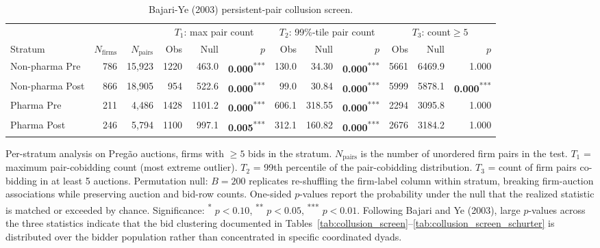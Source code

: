 \begin{table}[!htbp]
\centering
\begin{threeparttable}
\caption{Bajari-Ye (2003) persistent-pair collusion screen.}
\label{tab:collusion_screen_bajariye}
\footnotesize
\setlength{\tabcolsep}{4pt}
\providecommand{\sym}[1]{\textsuperscript{#1}}
\begin{tabular}{lrrrrrrrrrrr}
\toprule
 & & & \multicolumn{3}{c}{$T_1$: max pair count} & \multicolumn{3}{c}{$T_2$: 99\%-tile pair count} & \multicolumn{3}{c}{$T_3$: count$\geq 5$} \\
\cmidrule(lr){4-6}\cmidrule(lr){7-9}\cmidrule(lr){10-12}
Stratum & $N_{\mathrm{firms}}$ & $N_{\mathrm{pairs}}$ & Obs & Null & $p$ & Obs & Null & $p$ & Obs & Null & $p$ \\
\midrule
Non-pharma Pre & 786 & 15,923 & 1220 & 463.0 & \textbf{0.000}\sym{***} & 130.0 & 34.30 & \textbf{0.000}\sym{***} & 5661 & 6469.9 & 1.000 \\
Non-pharma Post & 866 & 18,905 & 954 & 522.6 & \textbf{0.000}\sym{***} & 99.0 & 30.84 & \textbf{0.000}\sym{***} & 5999 & 5878.1 & \textbf{0.000}\sym{***} \\
Pharma Pre & 211 & 4,486 & 1428 & 1101.2 & \textbf{0.000}\sym{***} & 606.1 & 318.55 & \textbf{0.000}\sym{***} & 2294 & 3095.8 & 1.000 \\
Pharma Post & 246 & 5,794 & 1100 & 997.1 & \textbf{0.005}\sym{***} & 312.1 & 160.82 & \textbf{0.000}\sym{***} & 2676 & 3184.2 & 1.000 \\
\bottomrule
\end{tabular}
\begin{tablenotes}[flushleft]\footnotesize
\item Per-stratum analysis on Preg\~ao auctions, firms with $\geq 5$ bids in the stratum. $N_{\mathrm{pairs}}$ is the number of unordered firm pairs in the test. $T_1$ = maximum pair-cobidding count (most extreme outlier). $T_2$ = 99th percentile of the pair-cobidding distribution. $T_3$ = count of firm pairs co-bidding in at least 5 auctions. Permutation null: $B = 200$ replicates re-shuffling the firm-label column within stratum, breaking firm-auction associations while preserving auction and bid-row counts. One-sided $p$-values report the probability under the null that the realized statistic is matched or exceeded by chance. Significance: \sym{*} $p<0.10$, \sym{**} $p<0.05$, \sym{***} $p<0.01$. Following Bajari and Ye (2003), large $p$-values across the three statistics indicate that the bid clustering documented in Tables~\ref{tab:collusion_screen}--\ref{tab:collusion_screen_schurter} is distributed over the bidder population rather than concentrated in specific coordinated dyads.
\end{tablenotes}
\end{threeparttable}
\end{table}
